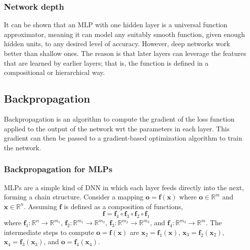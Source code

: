 \documentclass[11pt]{article}
\begin{document}
\subsubsection*{Network depth}
It can be shown that an MLP with one hidden layer is a universal function approximator, meaning it can model any suitably smooth function, given enough hidden units, to any desired level of accuracy.
However, deep networks work better than shallow ones. The reason is that later layers can leverage the features that are learned by earlier layers; 
that is, the function is defined in a compositional or hierarchical way.

\subsection{Backpropagation}
Backpropagation is an algorithm to compute the gradient of the loss function applied to the output of the network wrt the parameters in each layer.
This gradient can then be passed to a gradient-based optimization algorithm to train the network.

\subsubsection{Backpropagation for MLPs}
MLPs are a simple kind of DNN in which each layer feeds directly into the next, forming a chain
structure. Consider a mapping $\boldsymbol{o} = \boldsymbol{f}(\boldsymbol{x})$ where $\boldsymbol{o} \in \mathbb{R}^m$ and $\boldsymbol{x} \in \mathbb{R}^n$.
Assuming $\boldsymbol{f}$ is defined as a composition of functions,
\[
\boldsymbol{f} = \boldsymbol{f}_4 \circ \boldsymbol{f}_3 \circ \boldsymbol{f}_2 \circ \boldsymbol{f}_1
\]
where $\boldsymbol{f}_1 : \mathbb{R}^n \to \mathbb{R}^{m_1}$, $\boldsymbol{f}_2 : \mathbb{R}^{m_1} \to \mathbb{R}^{m_2}$, $\boldsymbol{f}_3 : \mathbb{R}^{m_2} \to \mathbb{R}^{m_3}$, and $\boldsymbol{f}_4 : \mathbb{R}^{m_3} \to \mathbb{R}^m$.
The intermediate steps to compute $\boldsymbol{o} = \boldsymbol{f}(\boldsymbol{x})$ are $\boldsymbol{x}_2 = \boldsymbol{f}_1(\boldsymbol{x})$, $\boldsymbol{x}_3 = \boldsymbol{f}_2(\boldsymbol{x}_2)$, $\boldsymbol{x}_4 = \boldsymbol{f}_3(\boldsymbol{x}_3)$, and $\boldsymbol{o} = \boldsymbol{f}_4(\boldsymbol{x}_4)$.
\end{document}
